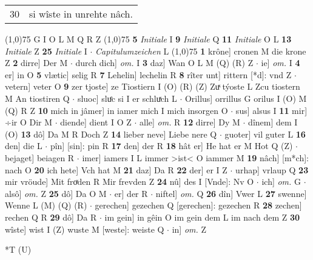 \documentclass[8pt,a4paper,notitlepage]{article}
\begin{document}
\begin{table}[ht]
\begin{minipage}[t]{0.5\linewidth}
\begin{tabular}{rl}
30 & si wîste in unrehte nâch.\\ 
\end{tabular}
\scriptsize
\line(1,0){75} \newline
G I O L M Q R Z \newline
\line(1,0){75} \newline
\textbf{5} \textit{Initiale} I  \textbf{9} \textit{Initiale} Q  \textbf{11} \textit{Initiale} O L  \textbf{13} \textit{Initiale} Z  \textbf{25} \textit{Initiale} I   $\cdot$ \textit{Capitulumzeichen} L  \newline
\line(1,0){75} \newline
\textbf{1} krône] cronen M die krone Z \textbf{2} dirre] Der M  $\cdot$ durch dich] \textit{om.} I \textbf{3} daz] Wan O L M (Q) (R) Z  $\cdot$ ie] \textit{om.} I \textbf{4} er] in O \textbf{5} vlætic] selig R \textbf{7} Lehelin] lechelin R \textbf{8} rîter unt] rittern [*d]: vnd Z  $\cdot$ vetern] veter O \textbf{9} zer tjoste] ze Tiostiern I (O) (R) (Z) Zuͯ týoste L Zcu tiostern M An tiostiren Q  $\cdot$ sluoc] sluͤc si I er schluͯch L  $\cdot$ Orillus] orrillus G orilus I (O) M (Q) R Z \textbf{10} mich in jâmer] in iamer mich I mich insorgen O  $\cdot$ sus] alsus I \textbf{11} mir] ÷ir O Dir M  $\cdot$ diende] dient I O Z  $\cdot$ alle] \textit{om.} R \textbf{12} dirre] Dy M  $\cdot$ dînem] dem I (O) \textbf{13} dô] Da M R Doch Z \textbf{14} lieber neve] Liebe nere Q  $\cdot$ guoter] vil guter L \textbf{16} den] die L  $\cdot$ pîn] [sin]: pin R \textbf{17} den] der R \textbf{18} hât er] He hat er M Hot Q (Z)  $\cdot$ bejaget] beiagen R  $\cdot$ imer] iamers I L immer >ist< O iammer M \textbf{19} nâch] [m*ch]: nach O \textbf{20} ich hete] Vch hat M \textbf{21} daz] Da R \textbf{22} der] er I Z  $\cdot$ urhap] vrlaup Q \textbf{23} mir vröude] Mit froͯden R Mir frevden Z \textbf{24} nû] des I [Vnde]: Nv O  $\cdot$ ich] \textit{om.} G  $\cdot$ alsô] \textit{om.} Z \textbf{25} dô] Da O M  $\cdot$ er] der R  $\cdot$ niftel] \textit{om.} Q \textbf{26} dîn] Vwer L \textbf{27} swenne] Wenne L (M) (Q) (R)  $\cdot$ gerechen] gezechen Q [gerechen]: gezechen R \textbf{28} zechen] rechen Q R \textbf{29} dô] Da R  $\cdot$ im gein] in gêin O im gein dem L im nach dem Z \textbf{30} wîste] wist I (Z) wuste M [weste]: weiste Q  $\cdot$ in] \textit{om.} Z \newline
\end{minipage}
\hspace{0.5cm}
\begin{minipage}[t]{0.5\linewidth}
\small
\begin{center}*T (U)

\end{center}
\end{minipage}
\end{table}
\end{document}
